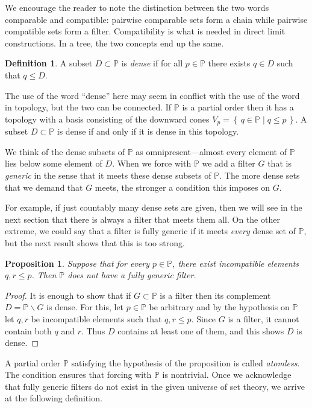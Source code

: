 \documentclass[11pt,oneside]{amsbook}
\newcommand{\set}[1]{\left\{\,#1\,\right\}}
\newcommand{\PP}{\mathbb P}
\theoremstyle{definition}
\theoremstyle{plain}
\newtheorem{prop}[thm]{Proposition}
\theoremstyle{definition}
\newtheorem{defn}[thm]{Definition}
\theoremstyle{remark}
\begin{document}
We encourage the reader to note the distinction between the two words comparable and compatible: pairwise comparable sets form a chain while pairwise compatible sets form a filter. Compatibility is what is needed in direct limit constructions. In a tree, the two concepts end up the same.

\begin{defn}
  A subset $D\subset\PP$ is \emph{dense} if for all $p\in\PP$ there exists $q\in D$ such that $q\leq D$.
\end{defn}

The use of the word ``dense'' here may seem in conflict  with the use of the word in topology, but the two can be connected. If $\PP$ is a partial order then it has a topology with a basis consisting of the downward cones $V_p=\set{q\in\PP\mid q\leq p}$. A subset $D\subset\PP$ is dense if and only if it is dense in this topology.

We think of the dense subsets of $\PP$ as omnipresent---almost every element of $\PP$ lies below some element of $D$. When we force with $\PP$ we add a filter $G$ that is \emph{generic} in the sense that it meets these dense subsets of $\PP$. The more dense sets that we demand that $G$ meets, the stronger a condition this imposes on $G$.

For example, if just countably many dense sets are given, then we will see in the next section that there is always a filter that meets them all. On the other extreme, we could say that a filter is fully generic if it meets \emph{every} dense set of $\PP$, but the next result shows that this is too strong.

\begin{prop}
  Suppose that for every $p\in\PP$, there exist incompatible elements $q,r\leq p$. Then $\PP$ does not have a fully generic filter.
\end{prop}

\begin{proof}
  It is enough to show that if $G\subset\PP$ is a filter then its complement $D=\PP\smallsetminus G$ is dense. For this, let $p\in\PP$ be arbitrary and by the hypothesis on $\PP$ let $q,r$ be incompatible elements such that $q,r\leq p$. Since $G$ is a filter, it cannot contain both $q$ and $r$. Thus $D$ contains at least one of them, and this shows $D$ is dense.
\end{proof}

A partial order $\PP$ satisfying the hypothesis of the proposition is called \emph{atomless}. The condition ensures that forcing with $\PP$ is nontrivial. Once we acknowledge that fully generic filters do not exist in the given universe of set theory, we arrive at the following definition.
\end{document}
